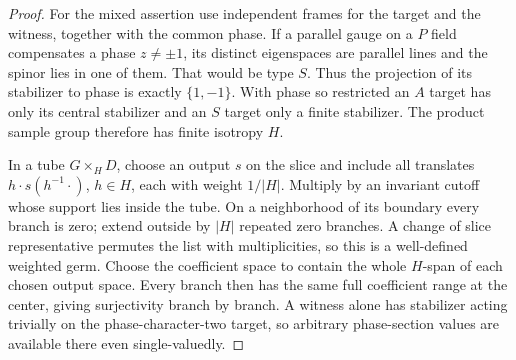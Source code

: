 \begin{proof}
For the mixed assertion use independent frames for the target and the
witness, together with the common phase.  If a parallel gauge on a
$P$ field compensates a phase $z\ne\pm1$, its distinct eigenspaces are
parallel lines and the spinor lies in one of them.  That would be type
$S$.  Thus the projection of its stabilizer to phase is exactly
$\{1,-1\}$.  With phase so restricted an $A$ target has only its central
stabilizer and an $S$ target only a finite stabilizer.  The product sample
group therefore has finite isotropy $H$.

In a tube $G\times_HD$, choose an output $s$ on the slice and include
all translates $h\cdot s(h^{-1}\cdot)$, $h\in H$, each with weight
$1/|H|$.  Multiply by an invariant cutoff whose support lies inside
the tube.  On a neighborhood of its boundary every branch is zero;
extend outside by $|H|$ repeated zero branches.  A change of slice
representative permutes the list with multiplicities, so this is a
well-defined weighted germ.  Choose the coefficient space to contain
the whole $H$-span of each chosen output space.  Every branch then has
the same full coefficient range at the center, giving surjectivity
branch by branch.  A witness alone has stabilizer acting trivially on
the phase-character-two target, so arbitrary phase-section values are
available there even single-valuedly.
\end{proof}

